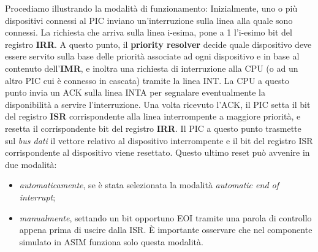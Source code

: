 Procediamo illustrando la modalità di funzionamento:
Inizialmente, uno o più dispositivi connessi al PIC inviano un'interruzione sulla linea alla quale sono connessi. La richiesta che arriva sulla linea i-esima, pone a 1 l'i-esimo bit del registro \textbf{IRR}. A questo punto, il \textbf{priority resolver} decide quale dispositivo deve essere servito sulla base delle priorità associate ad ogni dispositivo e in base al contenuto dell'\textbf{IMR}, e inoltra una richiesta di interruzione alla CPU (o ad un altro PIC cui è connesso in cascata) tramite la linea INT. La CPU a questo punto invia un ACK sulla linea INTA per segnalare eventualmente la disponibilità a servire l'interruzione. 
Una volta ricevuto l'ACK, il PIC setta il bit del registro \textbf{ISR} corrispondente alla linea interrompente a maggiore priorità, e resetta il corrispondente bit del registro \textbf{IRR}. Il PIC a questo punto trasmette sul \textit{bus dati} il vettore relativo al dispositivo interrompente e il bit del registro ISR corrispondente al dispositivo viene resettato. Questo ultimo reset può avvenire in due modalità:
\begin{itemize}
    \linespread{0.4}
    \item \textit{automaticamente}, se è stata selezionata la modalità \textit{automatic end of interrupt};
    \item \textit{manualmente}, settando un bit opportuno EOI tramite una parola di controllo appena prima di uscire dalla ISR. \uppercase{è} importante osservare che nel componente simulato in ASIM funziona solo questa modalità.
\end{itemize}

